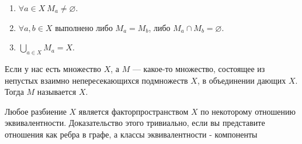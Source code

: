         \begin{enumerate}
            \item $\forall a\in X~M_a\neq\varnothing$.
            \item $\forall a,b\in X$ выполнено либо $M_a=M_b$, либо $M_a\cap M_b=\varnothing$.
            \item $\bigcup\limits_{a\in X}M_a=X$.
        \end{enumerate}

          Если у нас есть множество $X$, а $M$ --- какое-то множество, состоящее из непустых взаимно непересекающихся подмножеств $X$, в объединении дающих $X$. Тогда $M$ называется  $X$.


          Любое разбиение $X$ является факторпространством $X$ по некоторому отношению эквивалентности. Доказательство этого тривиально, если вы представите отношения как ребра в графе, а классы эквивалентности - компоненты
  

    
